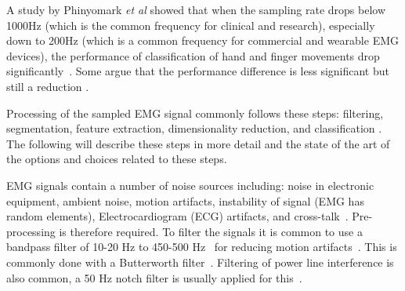 

A study by Phinyomark \textit{et al} showed that when the sampling rate drops below 1000Hz (which is the common frequency for clinical and research), especially down to 200Hz (which is a common frequency for commercial and wearable EMG devices), the performance of classification of hand and finger movements drop significantly~\cite{phinyomarkFeatureExtractionSelection2018}. Some argue that the performance difference is less significant but still a reduction \cite{millarLSTMNetworkClassification2022}. 

Processing of the sampled EMG signal commonly follows these steps: filtering, segmentation, feature extraction, dimensionality reduction, and classification \cite{tenoreDecodingIndividuatedFinger2009}\cite{kDevelopmentSurfaceEMGBased2018}\cite{englehartClassificationMyoelectricSignal1999}\cite{phinyomarkEMGFeatureEvaluation2013}. The following will describe these steps in more detail and the state of the art of the options and choices related to these steps.

EMG signals contain a number of noise sources including: noise in electronic equipment, ambient noise, motion artifacts, instability of signal (EMG has random elements), Electrocardiogram (ECG) artifacts, and cross-talk~\cite{nazmiReviewClassificationTechniques2016}. Pre-processing is therefore required.
To filter the signals it is common to use a bandpass filter of 10-20 Hz to 450-500 Hz~\cite{botrosElectromyographyBasedGestureRecognition2022}\cite{phinyomarkApplicationWaveletAnalysis2011}\cite{samuelPatternRecognitionElectromyography2018} for reducing motion artifacts~\cite{nazmiReviewClassificationTechniques2016}. This is commonly done with a Butterworth filter~\cite{phinyomarkFeatureReductionSelection2012}\cite{nazmiReviewClassificationTechniques2016}\cite{tenoreDecodingIndividuatedFinger2009}\cite{al-timemyClassificationFingerMovements2013}\cite{leeElectromyogramBasedClassificationHand2021}. Filtering of power line interference is also common, a 50 Hz notch filter is usually applied for this~\cite{schemeElectromyogramPatternRecognition2011}\cite{samuelPatternRecognitionElectromyography2018}\cite{hristovClassificationIndividualCombined2022}\cite{millarLSTMNetworkClassification2022}. 

